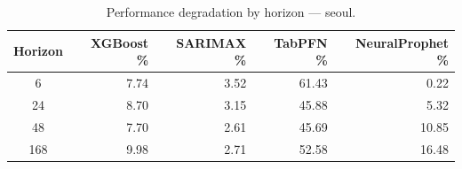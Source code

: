 \begin{table}[h]
\centering
\caption{Performance degradation by horizon — seoul.}
\label{tab:degradation_horizon_seoul}
\begin{tabular}{crrrr}
\toprule
Horizon & XGBoost \% & SARIMAX \% & TabPFN \% & NeuralProphet \% \\
\midrule
6 & 7.74 & 3.52 & 61.43 & 0.22 \\
24 & 8.70 & 3.15 & 45.88 & 5.32 \\
48 & 7.70 & 2.61 & 45.69 & 10.85 \\
168 & 9.98 & 2.71 & 52.58 & 16.48 \\
\bottomrule
\end{tabular}
\end{table}
